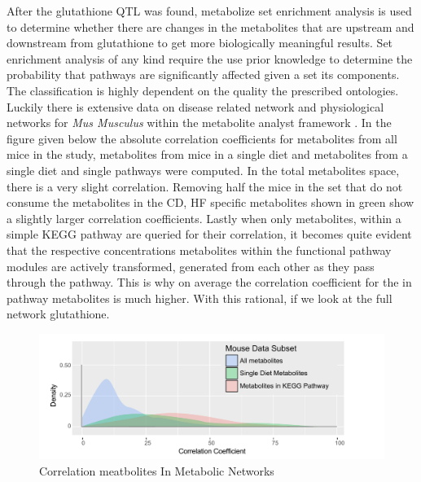 \documentclass[a4paper]{book}
\begin{document}
	After the glutathione QTL was found, metabolize set enrichment analysis is used to determine whether there are changes in the metabolites that are upstream and downstream from glutathione to get more biologically meaningful results. Set enrichment analysis of any kind require the use prior knowledge to determine the probability that pathways are significantly affected given a set its components. The classification is highly dependent on the quality the prescribed ontologies. Luckily there is extensive data on disease related network and physiological networks for \textit{Mus Musculus} within the metabolite analyst framework \citep{Xia2016UsingAnalysis}. In the figure given below the absolute correlation coefficients for metabolites from all mice in the study, metabolites from mice in a single diet and metabolites from a single diet and single pathways were computed. In the total metabolites space, there is a very slight correlation. Removing half the mice in the set that do not consume the metabolites in the CD, HF specific metabolites shown in green show a slightly larger correlation coefficients. Lastly when only metabolites, within a simple KEGG pathway are queried for their correlation, it becomes quite evident that the respective concentrations metabolites within the functional pathway modules are actively transformed, generated from each other as they pass through the pathway. This is why on average the correlation coefficient for the in pathway metabolites is much higher. With this rational, if we look at the  full network glutathione.
	
	\begin{figure}[htb!]
		\centering
		\includegraphics[width=\linewidth]{3.Metabolomics/KEGG_Path_Correlations}
		\caption{Correlation meatbolites In Metabolic Networks}
		\label{fig:keggpathcorrelations}
	\end{figure}
	
\end{document}
